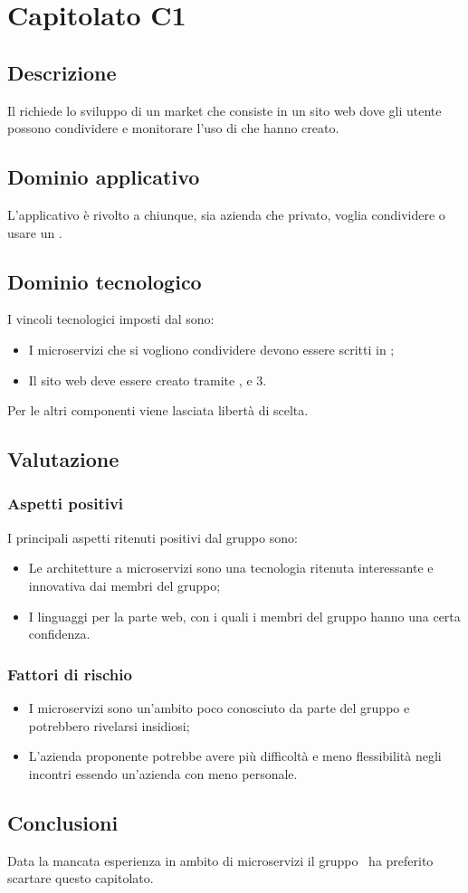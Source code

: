 \documentclass[../StudioDiFattibilita.tex]{subfiles}
\begin{document}
	\section{Capitolato C1}
		\subsection{Descrizione}
		Il  richiede lo sviluppo di un  market che consiste in un sito web dove gli utente possono condividere e monitorare l'uso di  che hanno creato.
		\subsection{Dominio applicativo}
		L'applicativo è rivolto a chiunque, sia azienda che privato, voglia condividere o usare un .
		\subsection{Dominio tecnologico} 
		I vincoli tecnologici imposti dal  sono:
		\begin{itemize}
			\item I microservizi che si vogliono condividere devono essere scritti in ;
			\item Il sito web deve essere creato tramite ,  e 3.
		\end{itemize}
		Per le altri componenti viene lasciata libertà di scelta.
		\subsection{Valutazione}
			\subsubsection{Aspetti positivi}
			I principali aspetti ritenuti positivi dal gruppo sono:
				\begin{itemize}
				\item Le architetture a microservizi sono una tecnologia ritenuta interessante e innovativa dai membri del gruppo; 
				\item I linguaggi per la parte web, con i quali i membri del gruppo hanno una certa confidenza.
			\end{itemize}
			\subsubsection{Fattori di rischio}
				\begin{itemize}
				\item I microservizi sono un'ambito poco conosciuto da parte del gruppo e potrebbero rivelarsi insidiosi;
				\item L'azienda proponente potrebbe avere più difficoltà e meno flessibilità negli incontri essendo un'azienda con meno personale.
			\end{itemize}
			\subsection{Conclusioni}
			Data la mancata esperienza in ambito di microservizi il gruppo \kaleidoscode\ ha preferito scartare questo capitolato.
\end{document}
